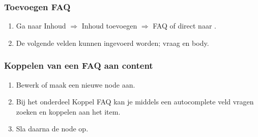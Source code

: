 \subsubsection{Toevoegen FAQ}

\begin{enumerate}
\item Ga naar Inhoud $\Rightarrow$ Inhoud toevoegen $\Rightarrow$ FAQ of direct naar .
\item De volgende velden kunnen ingevoerd worden; vraag en body.
\end{enumerate}

\subsubsection{Koppelen van een FAQ aan content}

\begin{enumerate}
\item Bewerk of maak een nieuwe node aan.
\item Bij het onderdeel Koppel FAQ kan je middels een autocomplete veld vragen zoeken en koppelen aan het item.
\item Sla daarna de node op.
\end{enumerate}